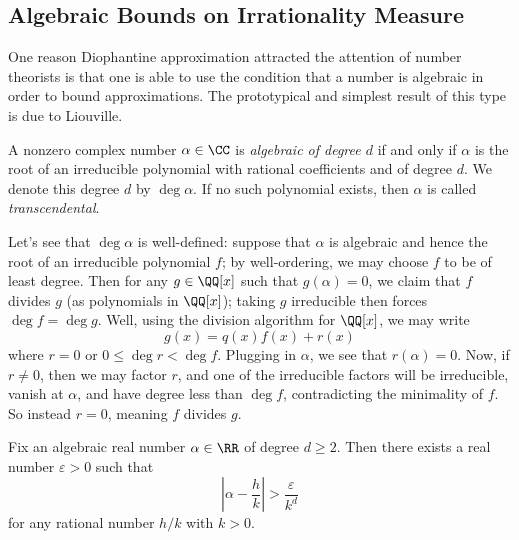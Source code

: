 \documentclass[../notes.tex]{subfiles}
\begin{document}
\subsection{Algebraic Bounds on Irrationality Measure}
One reason Diophantine approximation attracted the attention of number theorists is that one is able to use the condition that a number is algebraic in order to bound approximations. The prototypical and simplest result of this type is due to Liouville.
\begin{defihelper}  
	A nonzero complex number $\alpha\in\CC$ is \textit{algebraic of degree $d$} if and only if $\alpha$ is the root of an irreducible polynomial with rational coefficients and of degree $d$. We denote this degree $d$ by $\deg\alpha$. If no such polynomial exists, then $\alpha$ is called \textit{transcendental}.
\end{defihelper}
\begin{remark} \label{rem:deg-alpha-uniq}
	Let's see that $\deg\alpha$ is well-defined: suppose that $\alpha$ is algebraic and hence the root of an irreducible polynomial $f$; by well-ordering, we may choose $f$ to be of least degree. Then for any $g\in\QQ[x]$ such that $g(\alpha)=0$, we claim that $f$ divides $g$ (as polynomials in $\QQ[x]$); taking $g$ irreducible then forces $\deg f=\deg g$. Well, using the division algorithm for $\QQ[x]$, we may write
	\[g(x)=q(x)f(x)+r(x)\]
	where $r=0$ or $0\le\deg r<\deg f$. Plugging in $\alpha$, we see that $r(\alpha)=0$. Now, if $r\ne0$, then we may factor $r$, and one of the irreducible factors will be irreducible, vanish at $\alpha$, and have degree less than $\deg f$, contradicting the minimality of $f$. So instead $r=0$, meaning $f$ divides $g$.
\end{remark}
\begin{proposition}[Liouville] \label{prop:liouville}
	Fix an algebraic real number $\alpha\in\RR$ of degree $d\ge2$. Then there exists a real number $\varepsilon>0$ such that
	\[\left|\alpha-\frac hk\right|>\frac\varepsilon{k^d}\]
	for any rational number $h/k$ with $k>0$.
\end{proposition}
\end{document}
